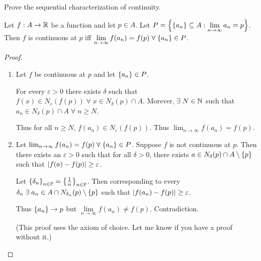 \documentclass[12pt]{article}
\begin{document}
\begin{problem}
    Prove the sequential characterization of continuity.
\end{problem}
\begin{thm} \label{thm:cont:sequential_characterization}
    Let $f : A \to \mathbb{R}$ be a function and let $p \in A$.
    Let $P = \set{\set{a_{n}} \subseteq A : \lim\limits_{n \to \infty} a_{n} = p}$.
    Then $f$ is continuous at $p$ iff $\lim\limits_{n \to \infty} f(a_{n}) = f(p) \;\forall\; \set{a_{n}} \in P$.
\end{thm}
\begin{proof} \leavevmode
    \begin{enumerate}[label=(\alph*)]
        \item Let $f$ be continuous at $p$ and let $\set{a_{n}} \in P$.

        For every $\varepsilon > 0$ there exists $\delta$ such that $f(x) \in N_{\varepsilon}(f(p)) \;\forall\; x \in N_{\delta}(p) \cap A$.
        Morever, $\exists\; N \in \mathbb{N}$ such that $ a_{n} \in N_{\delta}(p) \cap A \;\forall\; n \geq N$.

        Thus for all $n \geq N$, $ f(a_{n}) \in N_{\varepsilon}(f(p))$.
        Thus $\lim_{n \to \infty} f(a_{n}) = f(p)$.
        \item Let $\lim_{n \to \infty} f(a_{n}) = f(p) \;\forall\; \set{a_{n}} \in P$.
        Suppose $f$ is not continuous at $p$.
        Then there exists an $\varepsilon > 0$ such that for all $\delta > 0$, there exists $a \in N_{\delta}(p) \cap A \setminus \set{p}$ such that $\abs{f(a) - f(p)} \geq \varepsilon$.

        Let $\set{\delta_{n}}_{n \in \P} = \set{\frac{1}{n}}_{n \in \P}$.
        Then corresponding to every $\delta_{n} \;\exists\; a_{n} \in A \cap N_{\delta_{n}}(p) \setminus \set{p}$ such that $\abs{f(a_{n}) - f(p)} \geq \varepsilon$.

        Thus $\set{a_{n}} \to p$ but $\lim\limits_{n \to \infty} f(a_{n}) \neq f(p)$.
        Contradiction. \qedhere

        (This proof uses the axiom of choice. Let me know if you have a proof without it.)
    \end{enumerate}
\end{proof}
\end{document}
